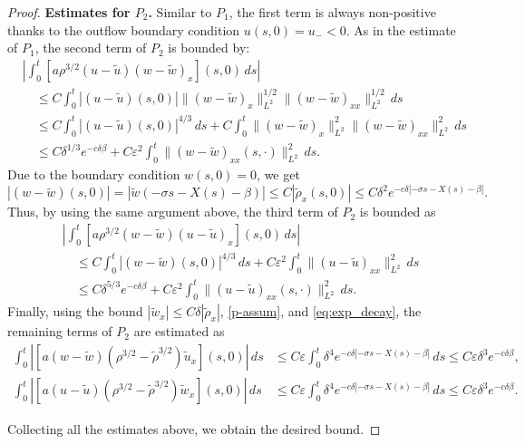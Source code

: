 \documentclass[11pt,reqno]{amsart}
\numberwithin{equation}{section} %
\begin{document}
\begin{proof}
\noindent \textbf{Estimates for $P_2$.} 
Similar to $P_1$, the first term is always non-positive thanks to the outflow boundary condition $u(s,0)=u_-<0$. As in the estimate of $P_1$, the second term of $P_2$ is bounded by:
\begin{align*}
    &\left| \int_0^t \left[ a \rho^{3/2} (u-\tilde{u})(w-\tilde{w})_x \right](s,0) \, ds \right| \\
    &\quad \leq C \int_0^t |(u-\tilde{u})(s,0)| \|(w-\tilde{w})_x\|_{L^2}^{1/2} \|(w-\tilde{w})_{xx}\|_{L^2}^{1/2} \, ds\\
    &\quad \leq C\int_0^t |(u-\tilde{u})(s,0)|^{4/3} \, ds + C\int_0^t \|(w-\tilde{w})_x\|_{L^2}^{2} \|(w-\tilde{w})_{xx}\|_{L^2}^{2} \, ds\\
    &\quad \leq C\delta^{1/3}e^{-c\delta\beta} + C\varepsilon^2\int_0^t \|(w-\tilde{w})_{xx}(s,\cdot)\|_{L^2}^{2} \, ds.
\end{align*}
Due to the boundary condition $w(s,0)=0$, we get
\[
|(w-\tilde{w})(s,0)| = |\tilde{w}(-\sigma s -X(s)-\beta)| \le C | \tilde{\rho}_x(s,0) | \le C \delta^2 e^{-c\delta|-\sigma s - X(s) - \beta|}.
\] 
Thus, by using the same argument above, the third term of $P_2$ is bounded as 
\begin{align*}
    &\left| \int_0^t \left[ a \rho^{3/2} (w-\tilde{w})(u-\tilde{u})_x \right](s,0) \, ds \right| \\
    &\quad \le C\int_0^t |(w-\tilde{w})(s,0)|^{4/3} \, ds + C\varepsilon^2\int_0^t \|(u-\tilde{u})_{xx}\|_{L^2}^{2} \, ds \\
    &\quad \leq C\delta^{5/3}e^{-c\delta\beta} + C\varepsilon^2\int_0^t \|(u-\tilde{u})_{xx}(s,\cdot)\|_{L^2}^{2} \, ds. 
\end{align*}
Finally, using the bound $|\tilde{w}_x| \le C \delta |\tilde{\rho}_x|$, \eqref{p-assum}, and \eqref{eq:exp_decay}, the remaining terms of $P_2$ are estimated as
\begin{align*}
    \int_0^t \left| \left[ a(w-\tilde{w})(\rho^{3/2}-\tilde{\rho}^{3/2})\tilde{u}_x \right](s,0) \right| \, ds &\leq C \varepsilon \int_0^t \delta^{4}e^{-c\delta|-\sigma s - X(s) - \beta|} \, ds \leq C \varepsilon \delta^3 e^{-c\delta\beta}, \\
    \int_0^t \left| \left[ a(u-\tilde{u})(\rho^{3/2} - \tilde{\rho}^{3/2})\tilde{w}_x \right](s,0) \right| \, ds &\leq C\varepsilon \int_0^t \delta^4 e^{-c\delta|-\sigma s - X(s) - \beta|} \, ds \leq C \varepsilon \delta^3 e^{-c\delta\beta}.
\end{align*}

Collecting all the estimates above, we obtain the desired bound.
\end{proof}
\end{document}
